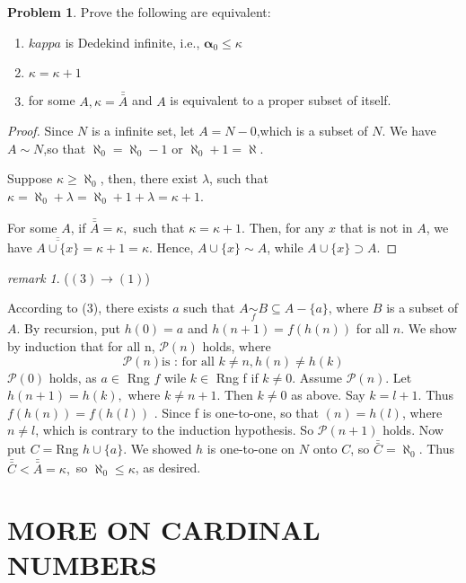 \documentclass[a4paper,11pt]{article}%
\theoremstyle{remark}
\newtheorem*{remark}{remark}
\theoremstyle{definition}
\newtheorem{problem}{Problem}[subsection]
\begin{document}
\begin{problem}
    Prove the following are equivalent:
    \begin{enumerate}
        \item $kappa$ is Dedekind infinite, i.e., $\bm{\alpha}_0\leq\kappa$
        \item $\kappa=\kappa+1$
        \item for some $A,\kappa=\bar{\bar{A}}$ and $A$ is equivalent to a proper subset of itself.
    \end{enumerate}
    \begin{proof}
        Since $N$ is a infinite set, let $A=N-{0}$,which is a subset of $N$.
        We have $A\sim N$,so that $\aleph_0=\aleph_0 -1$ or $\aleph_0+1=\aleph$.

        Suppose $\kappa\geq\aleph_0$, then, there exist $\lambda$, such that $\kappa=\aleph_0+\lambda=\aleph_0+1+\lambda=\kappa+1$.

        For some $A$, if $\bar{\bar{A}}=\kappa,$ such that $\kappa=\kappa+1$.
        Then, for any $x$ that is not in $A$, we have $\overline{\overline{A\cup\{x\}}}=\kappa+1=\kappa$.
        Hence, $A\cup\{x\}\sim A$, while $A\cup\{x\}\supset A$.

    \end{proof}
    \begin{remark}
        ($(3)\rightarrow(1)$)

        According to (3), there exists $a$ such that $A\underset{f}{\sim } B\subseteq A-\{a\}$,
        where $B$ is a subset of $A$. By recursion, put $h(0)=a$ and $h(n+1)=f(h(n))$
        for all $n$. We show by induction that for all n, $\mathcal{P}(n)$ holds, where 
        \[\mathcal{P}(n) \text{is : for all } k\neq n, h(n)\neq h(k)\]
        $\mathcal{P}(0)$ holds, as $a\in $ Rng $f$ wile $k\in $ Rng f if $k\neq 0$. 
        Assume $\mathcal{P}(n).$ Let $h(n+1)=h(k), $ where $k\neq n+1$. Then $k\neq 0$ as above.
        Say $k=l+1$. Thus $f(h(n))=f(h(l))$ . Since f is one-to-one, so that $(n)=h(l)$, where $n\neq l$,
        which is contrary to the induction hypothesis. So $\mathcal{P}(n+1)$ holds.
        Now put $C=$Rng $h\cup\{a\}$. We showed $h$ is one-to-one on $N$ onto $C$, so $\bar{\bar{C}}=\aleph_0.$
        Thus $\bar{\bar{C}}<\bar{\bar{A}}=\kappa,$ so $\aleph_0\leq\kappa$, as desired.
    \end{remark}
\end{problem}
\section{MORE ON CARDINAL NUMBERS}
\end{document}
